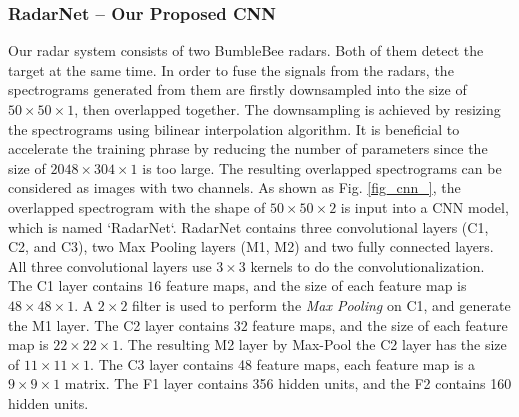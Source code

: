 \subsubsection{RadarNet – Our Proposed CNN}
Our radar system consists of two BumbleBee radars. Both of them detect the target at the same time. In order to fuse the signals from the radars, the spectrograms generated from them are firstly downsampled into the size of $50\times 50\times 1$, then overlapped together. The downsampling is achieved by resizing the spectrograms using bilinear interpolation algorithm. It is beneficial to accelerate the training phrase by reducing the number of parameters since the size of $2048\times 304\times 1$ is too large. The resulting overlapped spectrograms can be considered as images with two channels. As shown as Fig. \ref{fig_cnn_}, the overlapped spectrogram with the shape of $50\times 50\times 2$ is input into a CNN model, which is named `RadarNet`. RadarNet contains three convolutional layers (C1, C2, and C3), two Max Pooling layers (M1, M2) and two fully connected layers. All three convolutional layers use $3\times 3$ kernels to do the convolutionalization. The C1 layer contains $16$ feature maps, and the size of each feature map is $48\times 48\times 1$. A $2\times 2$ filter is used to perform the \textit{Max Pooling} on C1, and generate the M1 layer. The C2 layer contains $32$ feature maps, and the size of each feature map is $22\times 22\times 1$. The resulting M2 layer by Max-Pool the C2 layer has the size of $11\times 11\times 1$. The C3 layer contains 48 feature maps, each feature map is a $9\times 9\times 1$ matrix. The F1 layer contains 356 hidden units, and the F2 contains 160 hidden units.

